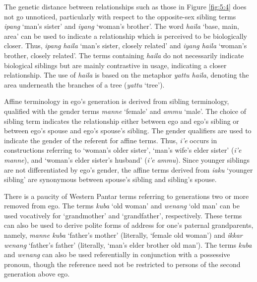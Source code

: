 The genetic distance between relationships such as those in Figure \ref{fig:5:4} does not go unnoticed, particularly with respect to the opposite-sex sibling terms \textit{ipang} `man's sister' and \textit{iyang} `woman's brother'. The word \textit{haila} `base, main, area' can be used to indicate a relationship which is perceived to be biologically closer. Thus, \textit{ipang haila} `man's sister, closely related' and \textit{iyang haila} `woman's brother, closely related'. The terms containing \textit{haila} do not necessarily indicate biological siblings but are mainly contrastive in usage, indicating a closer relationship. The use of \textit{haila} is based on the metaphor \textit{yattu haila}, denoting the area underneath the branches of a tree (\textit{yattu} `tree').

Affine terminology in ego's generation is derived from sibling terminology, qualified with the gender terms \textit{manne} `female' and \textit{ammu} `male'. The choice of sibling term indicates the relationship either between ego and ego's sibling or between ego's spouse and ego's spouse's sibling. The gender qualifiers are used to indicate the gender of the referent for affine terms. Thus, \textit{i'e} occurs in constructions referring to `woman's older sister', `man's wife's elder sister' (\textit{i'e manne}), and `woman's elder sister's husband' (\textit{i'e ammu}). Since younger siblings are not differentiated by ego's gender, the affine terms derived from \textit{iaku} `younger sibling' are synonymous between spouse's sibling and sibling's spouse.

There is a paucity of Western Pantar terms referring to generations two or more removed from ego. The terms \textit{kuba} `old woman' and \textit{wenang} `old man' can be used vocatively for `grandmother' and `grandfather', respectively. These terms can also be used to derive polite forms of address for one's paternal grandparents, namely, \textit{manne kuba} `father's mother' (literally, `female old woman') and \textit{ikkar wenang} `father's father' (literally, `man's elder brother old man'). The terms \textit{kuba} and \textit{wenang} can also be used referentially in conjunction with a possessive pronoun, though the reference need not be restricted to persons of the second generation above ego.




